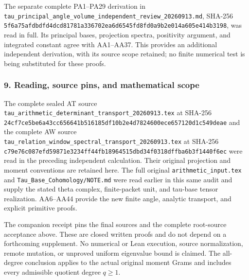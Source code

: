 \documentclass{article}
\begin{document}
The separate complete PA1--PA29 derivation in \nolinkurl{tau_principal_angle_volume_independent_review_20260913.md}, SHA-256 \nolinkurl{5f6a75afdbdfd4dcd81781a336702ea6d6545fd8fd0a9b2e014a605e414b3198}, was read in full. Its principal bases, projection spectra, positivity argument, and integrated constant agree with AA1--AA37. This provides an additional independent derivation, with its source scope retained; no finite numerical test is being substituted for these proofs.

\subsubsection{9. Reading, source pins, and mathematical scope}\label{endpoint-all_degree_angle_review--reading-source-pins-and-mathematical-scope}

The complete sealed AT source \nolinkurl{tau_arithmetic_determinant_transport_20260913.tex} at SHA-256 \nolinkurl{24cf7ce5be6a43cc656641b516185df10b2e4d7824600ece657120d1c549deae} and the complete AW source \nolinkurl{tau_relation_window_spectral_transport_20260913.tex} at SHA-256 \nolinkurl{c79e76c087efd59871e3234ff44fb18964515dbd34f0318dffba6b3f1440f6ec} were read in the preceding independent calculation. Their original projection and moment conventions are retained here. The full original \nolinkurl{arithmetic_input.tex} and \nolinkurl{Tau_Base_Cohomology/NOTE.md} were read earlier in this same audit and supply the stated theta complex, finite-packet unit, and tau-base tensor realization. AA6--AA44 provide the new finite angle, analytic transport, and explicit primitive proofs.

The companion receipt pins the final sources and the complete root-source acceptance above. These are closed written proofs and do not depend on a forthcoming supplement. No numerical or Lean execution, source normalization, remote mutation, or unproved uniform eigenvalue bound is claimed. The all-degree conclusion applies to the actual original moment Grams and includes every admissible quotient degree \(q\ge1\).

\endgroup
\end{document}
